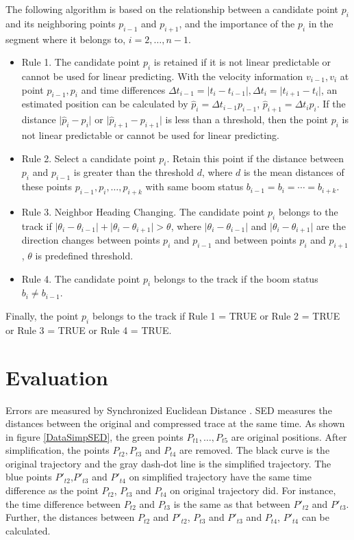 The following algorithm is based on the relationship between a candidate point $p_i$ and its neighboring points $p_{i-1}$ and $p_{i+1}$, and the importance of the $p_i$ in the segment where it belongs to, $i=2,\ldots,n-1$. 

\begin{itemize}\itemsep0em
\item Rule 1. The candidate point $p_i$ is retained if it is not linear predictable or cannot be used for linear predicting. With the velocity information $v_{i-1}, v_i$ at point $p_{i-1}, p_i$ and time differences $\Delta t_{i-1} = \lvert t_{i}-t_{i-1} \rvert,\Delta t_{i} = \lvert t_{i+1}-t_{i}\rvert$, an estimated position can be calculated by $\hat{p}_i=\Delta t_{i-1} p_{i-1}$, $\hat{p}_{i+1}=\Delta t_{i} p_{i}$. If the distance $\lvert \hat{p}_i-p_i\rvert$ or $\lvert \hat{p}_{i+1}-p_{i+1}\rvert$ is less than a threshold, then the point $p_i$ is not linear predictable or cannot be used for linear predicting.

\item Rule 2. Select a candidate point $p_i$. Retain this point if the distance between $p_i$ and $p_{i-1}$ is greater than the threshold $d$, where $d$ is the mean distances of these points $p_{i-1}, p_i, \ldots, p_{i+k}$ with same boom status $b_{i-1}=b_i=\cdots=b_{i+k}$. 

\item Rule 3. Neighbor Heading Changing. The candidate point $p_i$ belongs to the track if $\lvert \theta_i-\theta_{i-1}\rvert  + \lvert \theta_i-\theta_{i+1}\rvert >\theta$, where $\lvert \theta_i-\theta_{i-1}\rvert$ and $ \lvert \theta_i-\theta_{i+1}\rvert $ are the direction changes between points $p_i$ and $p_{i-1}$ and between points $p_i$ and $p_{i+1}$, $\theta$ is predefined threshold.

\item Rule 4. The candidate point $p_i$ belongs to the track if the boom status $b_i\neq b_{i-1}$.
\end{itemize}

Finally, the point $p_i$ belongs to the track if Rule 1 = TRUE or Rule 2 = TRUE or Rule 3 = TRUE or Rule 4 = TRUE.


\section{Evaluation}

Errors are measured by Synchronized Euclidean Distance \citep{lawson2011compression}. SED measures the distances between the original and compressed trace at the same time. As shown in figure \ref{DataSimpSED}, the green points $P_{t1}, \ldots ,P_{t5}$ are original positions. After simplification, the points $P_{t2}, P_{t3}$ and $P_{t4}$ are removed. The black curve is the original trajectory and the gray dash-dot line is the simplified trajectory. The blue points $P'_{t2}$,$P'_{t3}$ and $P'_{t4}$ on simplified trajectory have the same time difference as the point $P_{t2}$, $P_{t3}$ and $P_{t4}$ on original trajectory did. For instance, the time difference between $P_{t2}$ and $P_{t3}$ is the same as that between $P'_{t2}$ and $P'_{t3}$. Further, the distances between $P_{t2}$ and $P'_{t2}$, $P_{t3}$ and $P'_{t3}$ and $P_{t4}$, $P'_{t4}$ can be calculated.


